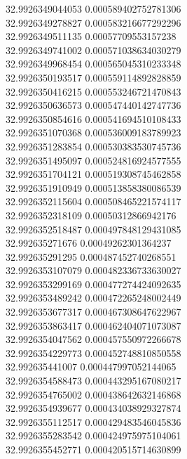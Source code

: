 {32.9926349044053	0.000589402752781306\\
32.9926349278827	0.000583216677292296\\
32.9926349511135	0.00057709553157238\\
32.9926349741002	0.000571038634030279\\
32.9926349968454	0.000565045310233348\\
32.9926350193517	0.000559114892828859\\
32.9926350416215	0.000553246721470843\\
32.9926350636573	0.000547440142747736\\
32.9926350854616	0.000541694510108433\\
32.9926351070368	0.000536009183789923\\
32.9926351283854	0.000530383530745736\\
32.9926351495097	0.000524816924577555\\
32.9926351704121	0.000519308745462858\\
32.9926351910949	0.000513858380086539\\
32.9926352115604	0.000508465221574117\\
32.9926352318109	0.00050312866942176\\
32.9926352518487	0.000497848129431085\\
32.992635271676	0.00049262301364237\\
32.992635291295	0.000487452740268551\\
32.9926353107079	0.000482336733630027\\
32.9926353299169	0.000477274424092635\\
32.9926353489242	0.000472265248002449\\
32.9926353677317	0.000467308647622967\\
32.9926353863417	0.000462404071073087\\
32.9926354047562	0.000457550972266678\\
32.9926354229773	0.000452748810850558\\
32.992635441007	0.000447997052144065\\
32.9926354588473	0.000443295167080217\\
32.9926354765002	0.000438642632146868\\
32.9926354939677	0.000434038929327874\\
32.9926355112517	0.000429483546045836\\
32.9926355283542	0.000424975975104061\\
32.9926355452771	0.000420515714630899\\
}
